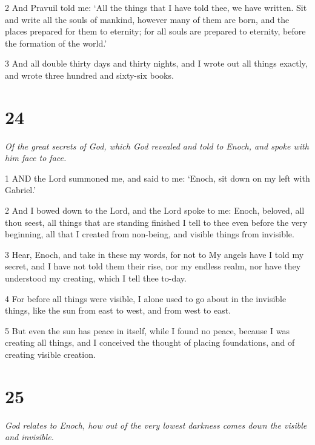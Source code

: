 \par 2 And Pravuil told me: ‘All the things that I have told thee, we have written. Sit and write all the souls of mankind, however many of them are born, and the places prepared for them to eternity; for all souls are prepared to eternity, before the formation of the world.’

\par 3 And all double thirty days and thirty nights, and I wrote out all things exactly, and wrote three hundred and sixty-six books.

\chapter{24}

\par \textit{Of the great secrets of God, which God revealed and told to Enoch, and spoke with him face to face.}

\par 1 AND the Lord summoned me, and said to me: ‘Enoch, sit down on my left with Gabriel.’

\par 2 And I bowed down to the Lord, and the Lord spoke to me: Enoch, beloved, all thou seest, all things that are standing finished I tell to thee even before the very beginning, all that I created from non-being, and visible things from invisible.

\par 3 Hear, Enoch, and take in these my words, for not to My angels have I told my secret, and I have not told them their rise, nor my endless realm, nor have they understood my creating, which I tell thee to-day.

\par 4 For before all things were visible, I alone used to go about in the invisible things, like the sun from east to west, and from west to east.

\par 5 But even the sun has peace in itself, while I found no peace, because I was creating all things, and I conceived the thought of placing foundations, and of creating visible creation.

\chapter{25}

\par \textit{God relates to Enoch, how out of the very lowest darkness comes down the visible and invisible.}

